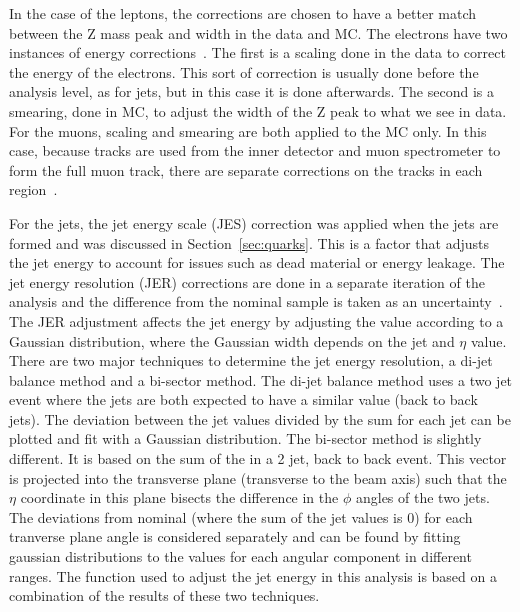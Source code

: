 In the case of the leptons, the corrections are chosen to have a better match between the Z mass peak and width in the data and MC.  The electrons have two instances of energy corrections~\cite{Electron}.  The first is a scaling done in the data to correct the energy of the electrons.  This sort of correction is usually done before the analysis level, as for jets, but in this case it is done afterwards.  The second is a smearing, done in MC, to adjust the width of the Z peak to what we see in data.  For the muons, scaling and smearing are both applied to the MC only.  In this case, because tracks are used from the inner detector and muon spectrometer to form the full muon track, there are separate corrections on the tracks in each region~\cite{MuonER}.

For the jets, the jet energy scale (JES) correction was applied when the jets are formed and was discussed in Section~\ref{sec:quarks}.  This is a factor that adjusts the jet energy to account for issues such as dead material or energy leakage.  The jet energy resolution (JER) corrections are done in a separate iteration of the analysis and the difference from the nominal sample is taken as an uncertainty~\cite{JER, JER2}.  The JER adjustment affects the jet energy by adjusting the value according to a Gaussian distribution, where the Gaussian width depends on the jet \pt and $\eta$ value.  There are two major techniques to determine the jet energy resolution, a di-jet balance method and a bi-sector method.  The di-jet balance method uses a two jet event where the jets are both expected to have a similar \pt value (back to back jets).  The deviation between the jet \pt values divided by the sum for each jet can be plotted and fit with a Gaussian distribution.  The bi-sector method is slightly different.  It is based on the sum of the \pt in a 2 jet, back to back event.  This \pt vector is projected into the transverse plane (transverse to the beam axis) such that the $\eta$ coordinate in this plane bisects the difference in the $\phi$ angles of the two jets.  The deviations from nominal (where the sum of the jet \pt values is 0) for each tranverse plane angle is considered separately and can be found by fitting gaussian distributions to the \pt values for each angular component in different \pt ranges.  The function used to adjust the jet energy in this analysis is based on a combination of the results of these two techniques.


